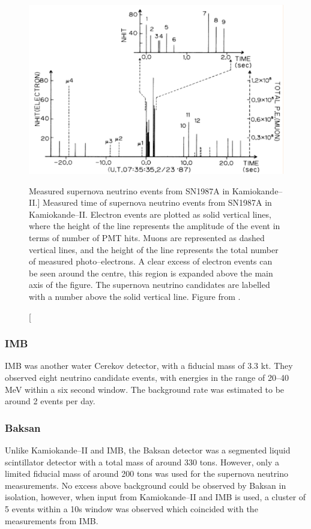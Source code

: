 \begin{figure}
	\centering
	\includegraphics{figures/kami_1987.pdf}
	\caption
	[Measured supernova neutrino events from SN1987A in Kamiokande--II.]
	{Measured time of supernova neutrino events from SN1987A in Kamiokande--II. 
	Electron events are plotted as solid vertical lines, where the height of the 
	line represents the amplitude of the event in terms of number of PMT hits. 
	Muons are represented as dashed vertical lines, and the height of the line 
	represents the total number of measured photo--electrons. A clear excess of 
	electron events can be seen around the centre, this region is expanded above 
	the main axis of the figure. The supernova neutrino candidates are labelled
	with a number above the solid vertical line. Figure from 
	\cite{Hirata:1987hu}.}
	\label{fig:kami_1987}
\end{figure}

\subsubsection{IMB}
IMB was another water Cerekov detector, with a fiducial mass of 3.3 kt. They
observed eight neutrino candidate events, with energies in the range of 20--40
MeV within a six second window. The background rate was estimated to be around 2
events per day\cite{PhysRevLett.58.1494}.

\subsubsection{Baksan}
Unlike Kamiokande--II and IMB, the Baksan detector was a segmented liquid
scintillator detector with a total mass of around 330 tons. However, only a
limited fiducial mass of around 200 tons was used for the supernova neutrino
measurements. No excess above background could be observed by Baksan
in isolation, however, when input from Kamiokande--II and IMB is used, a 
cluster of 5 events within a 10s window was observed which coincided with the 
measurements from IMB\cite{Loredo:2001rx}.

